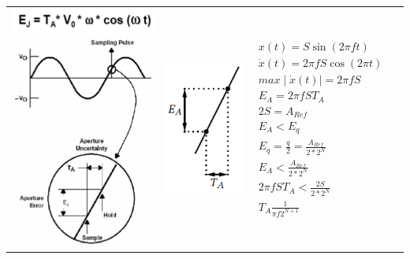 \begin{longtable}[c]{ l  l l l }
\begin{minipage}{4cm}

  \includegraphics[scale=0.45]{pictures/aperturfehlercos}

\end{minipage}
&
\begin{minipage}{3cm}

  \includegraphics[scale=0.5]{pictures/aperturfehler}
\end{minipage}
&
\begin{minipage}{5cm}
\begin{gather}
x(t)=S\sin(2\pi ft)\\
\dot{x}(t)=2\pi fS\cos(2\pi t)\\
max\mid\dot{x}(t)\mid= 2\pi fS \\
E_{A}=2\pi fST_{A}\\
2S=A_{Ref}\\
E_{A}<E_{q}\\
E_{q}=\frac{q}{2}=\frac{A_{Ref}}{2*2^N}\\
E_{A}<\frac{A_{Ref}}{2*2^N}\\
2\pi fST_{A} <\frac{2S}{2*2^N}\\
T_{A}\frac{1}{\pi f2^{N+1}}
\end{gather}




\end{minipage}
\end{longtable}
